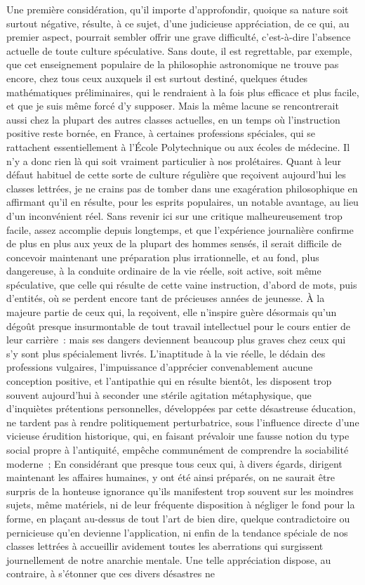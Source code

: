 \documentclass[french,twoside]{book} %
\begin{document}
Une première considération, qu’il importe d’approfondir, quoique sa nature soit surtout négative, résulte, à ce sujet, d’une judicieuse appréciation, de ce qui, au premier aspect, pourrait sembler offrir une grave difficulté, c’est-à-dire l’absence actuelle de toute culture spéculative. Sans doute, il est regrettable, par exemple, que cet enseignement populaire de la philosophie astronomique ne trouve pas encore, chez tous ceux auxquels il est surtout destiné, quelques études mathématiques préliminaires, qui le rendraient à la fois plus efficace et plus facile, et que je suis même forcé d’y supposer. Mais la même lacune se rencontrerait aussi chez la plupart des autres classes actuelles, en un temps où l’instruction positive reste bornée, en France, à certaines professions spéciales, qui se rattachent essentiellement à l’École Polytechnique ou aux écoles de médecine. Il n’y a donc rien là qui soit vraiment particulier à nos prolétaires. Quant à leur défaut habituel de cette sorte de culture régulière que reçoivent aujourd’hui les classes lettrées, je ne crains pas de tomber dans une exagération philosophique en affirmant qu’il en résulte, pour les esprits populaires, un notable avantage, au lieu d’un inconvénient réel. Sans revenir ici sur une critique malheureusement trop facile, assez accomplie depuis longtemps, et que l’expérience journalière confirme de plus en plus aux yeux de la plupart des hommes sensés, il serait difficile de concevoir maintenant une préparation plus irrationnelle, et au fond, plus dangereuse, à la conduite ordinaire de la vie réelle, soit active, soit même spéculative, que celle qui résulte de cette vaine instruction, d’abord de mots, puis d’entités, où se perdent encore tant de précieuses années de jeunesse. À la majeure partie de ceux qui, la reçoivent, elle n’inspire guère désormais qu’un dégoût presque insurmontable de tout travail intellectuel pour le cours entier de leur carrière : mais ses dangers deviennent beaucoup plus graves chez ceux qui s’y sont plus spécialement livrés. L’inaptitude à la vie réelle, le dédain des professions vulgaires, l’impuissance d’apprécier convenablement aucune conception positive, et l’antipathie qui en résulte bientôt, les disposent trop souvent aujourd’hui à seconder une stérile agitation métaphysique, que d’inquiètes prétentions personnelles, développées par cette désastreuse éducation, ne tardent pas à rendre politiquement perturbatrice, sous l’influence directe d’une vicieuse érudition historique, qui, en faisant prévaloir une fausse notion du type social propre à l’antiquité, empêche communément de comprendre la sociabilité moderne ; En considérant que presque tous ceux qui, à divers égards, dirigent maintenant les affaires humaines, y ont été ainsi préparés, on ne saurait être surpris de la honteuse ignorance qu’ils manifestent trop souvent sur les moindres sujets, même matériels, ni de leur fréquente disposition à négliger le fond pour la forme, en plaçant au-dessus de tout l’art de bien dire, quelque contradictoire ou pernicieuse qu’en devienne l’application, ni enfin de la tendance spéciale de nos classes lettrées à accueillir avidement toutes les aberrations qui surgissent journellement de notre anarchie mentale. Une telle appréciation dispose, au contraire, à s’étonner que ces divers désastres ne 
\end{document}
